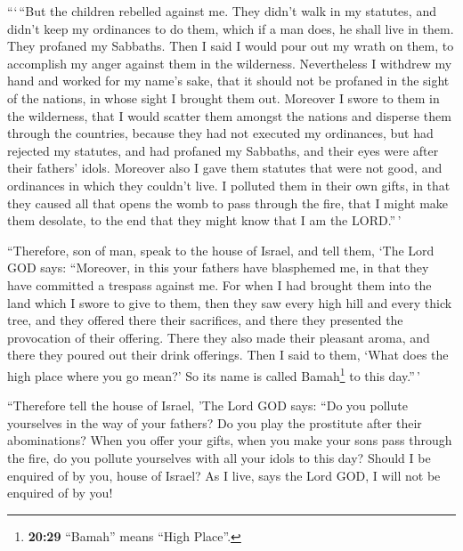  ```\,``But the children rebelled against me. They didn't
walk in my statutes, and didn't keep my ordinances to do them, which if
a man does, he shall live in them. They profaned my Sabbaths. Then I
said I would pour out my wrath on them, to accomplish my anger against
them in the wilderness.  Nevertheless I withdrew my hand
and worked for my name's sake, that it should not be profaned in the
sight of the nations, in whose sight I brought them out. 
Moreover I swore to them in the wilderness, that I would scatter them
amongst the nations and disperse them through the countries,
 because they had not executed my ordinances, but had
rejected my statutes, and had profaned my Sabbaths, and their eyes were
after their fathers' idols.  Moreover also I gave them
statutes that were not good, and ordinances in which they couldn't live.
 I polluted them in their own gifts, in that they caused
all that opens the womb to pass through the fire, that I might make them
desolate, to the end that they might know that I am the LORD.''\,'

 ``Therefore, son of man, speak to the house of Israel,
and tell them, `The Lord GOD says: ``Moreover, in this your fathers have
blasphemed me, in that they have committed a trespass against me.
 For when I had brought them into the land which I swore
to give to them, then they saw every high hill and every thick tree, and
they offered there their sacrifices, and there they presented the
provocation of their offering. There they also made their pleasant
aroma, and there they poured out their drink offerings. 
Then I said to them, `What does the high place where you go mean?' So
its name is called Bamah\footnote{\textbf{20:29} ``Bamah'' means ``High
  Place''.} to this day.''\,'

 ``Therefore tell the house of Israel, 'The Lord GOD
says: ``Do you pollute yourselves in the way of your fathers? Do you
play the prostitute after their abominations?  When you
offer your gifts, when you make your sons pass through the fire, do you
pollute yourselves with all your idols to this day? Should I be enquired
of by you, house of Israel? As I live, says the Lord GOD, I will not be
enquired of by you!

